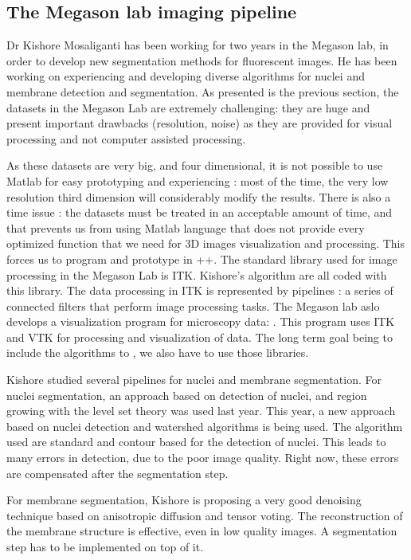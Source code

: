 \subsection{The Megason lab imaging pipeline}

Dr Kishore Mosaliganti has been working for two years in the Megason lab, in order to develop new segmentation methods for fluorescent images.
He has been working on experiencing and developing diverse algorithms for nuclei and membrane detection and segmentation.
As presented is the previous section, the datasets in the Megason Lab are extremely challenging:
they are huge and present important drawbacks (resolution, noise) as they are provided for visual processing and not computer assisted processing.

As these datasets are very big, and four dimensional, it is not possible to use Matlab for easy prototyping and experiencing : 
most of the time, the very low resolution third dimension will considerably modify the results.
There is also a time issue : the datasets must be treated in an acceptable amount of time,
and that prevents us from using Matlab language that does not provide every optimized function that we need for 3D images visualization and processing.
This forces us to program and prototype in {\C++}. The standard library used for image processing in the Megason Lab is ITK. Kishore's algorithm are all coded with this library.
The data processing in ITK is represented by pipelines : a series of connected filters that perform image processing tasks.
The Megason lab aslo develops a visualization program for microscopy data: {\gofigure}. This program uses ITK and VTK for processing and visualization of data. The long term goal being to include the algorithms to {\gofigure}, we also have to use those libraries.

Kishore studied several pipelines for nuclei and membrane segmentation.
For nuclei segmentation, an approach based on detection of nuclei, and region growing with the level set theory was used last year.
This year, a new approach based on nuclei detection and watershed algorithms is being used.
The algorithm used are standard and contour based for the detection of nuclei.
This leads to many errors in detection, due to the poor image quality. Right now, these errors are compensated after the segmentation step.

For membrane segmentation, Kishore is proposing a very good denoising technique based on anisotropic diffusion and tensor voting.
The reconstruction of the membrane structure is effective, even in low quality images. A segmentation step has to be implemented on top of it.


